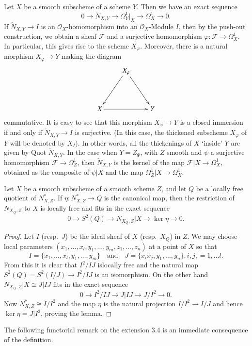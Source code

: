 \begin{subremark}\label{art05-rem3.3}
Let $X$ be a smooth subscheme of a scheme $Y$. Then we have an exact
sequence
$$
0\to \check{N}_{X,Y}\to \Omega^{1}_{Y}|_{X}\to \Omega^{1}_{X}\to 0.
$$
If $\check{N}_{X,Y}\to I$ is an $\mathscr{O}_{X}$-homomorphism into an
$\mathscr{O}_{X}$-Module $I$, then by the push-out construction, we
obtain a sheaf $\mathscr{F}$ and a surjective homomorphism
$\varphi:\mathscr{F}\to \Omega^{1}_{X}$. In particular, this gives
rise to the scheme $X_{\varphi}$. Moreover, there is a natural
morphism $X_{\varphi}\to Y$ making the diagram
\[
\xymatrix@R=1.5cm{
 & X_{\varphi}\ar[dl]\ar[dr] & \\
X\ar[rr] & & Y
}
\]
commutative. It is easy to see that this morphism $X_{\varphi}\to Y$
is a closed immersion if and only if $\check{N}_{X,Y}\to I$ is
surjective. (In this case, the thickened subscheme $X_{\varphi}$ of
$Y$ will be denoted by $X_{I}$). In other words, all the thickenings
of $X$ `inside' $Y$ are given by Quot $\check{N}_{X,Y}$. In the case
when $Y=Z_{\Psi}$, with $Z$ smooth and $\psi$ a surjective
homomorphism $\mathscr{F}\to \Omega^{1}_{Z}$, then $\check{N}_{X,Y}$
is the kernel of the map $\mathscr{F}|X\to \Omega^{1}_{X}$, obtained
as the composite of $\psi|X$ and the map
$\Omega^{1}_{Z}|X\to \Omega^{1}_{X}$.  
\end{subremark}

\begin{lemma}\label{art05-lem3.4}
Let $X$ be a smooth subscheme of a smooth scheme $Z$, and let $Q$ be a
locally free quotient of $N^{*}_{X,Z}$. If $\eta:N^{*}_{X,Z}\to Q$ is
the canonical map, then the restriction of $N_{X_{Q},Z}$ to $X$ is
locally free and fits in the exact sequence
$$
0\to S^{2}(Q)\to N_{X_{Q},Z}|X\to \ker \eta\to 0.
$$
\end{lemma}

\begin{proof}
Let $I$ (resp.~$J$) be the ideal sheaf of $X$ (resp.~$X_{Q}$) in
$Z$. We may choose local parameters
$(x_{1},\ldots,x_{l},y_{1},\ldots,y_{m},z_{1},\ldots,z_{n})$ at a
point of $X$ so that 
{\fontsize{10}{11}\selectfont
$$
I=\{x_{1},\ldots,x_{l},y_{1},\ldots,y_{m}\}\quad\text{and}\quad
J=\{x_{i}x_{j},y_{1},\ldots,y_{n}\}, i, j, =1,\ldots l.
$$}
From
this it is clear that $I^{2}/IJ$ is\pageoriginale locally free and the
natural map $S^{2}(Q)=S^{2}(I/J)\to I^{2}/IJ$ is an isomorphism. On
the other hand $N_{X_{Q},Z}|X\cong J|IJ$ fits in the exact sequence
$$
0\to I^{2}/IJ\to J|IJ\to J/I^{2}\to 0.
$$
Now $N^{*}_{X,Z}\cong I/I^{2}$ and the map $\eta$ is the natural
projection $I/I^{2}\to I/J$ and hence $\ker \eta=J|I^{2}$, proving the
lemma. 
\end{proof}
The following functorial remark on the extension 3.4 is an immediate
consequence of the definition.



